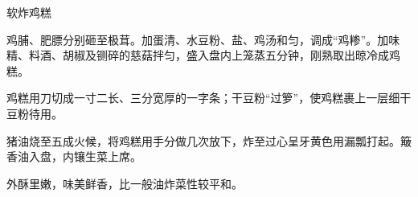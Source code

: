 %
%
%
%
%
%
%
\begin{recipe}{软炸鸡糕}

\ingredients


\preparation

\step 鸡脯、肥膘分别砸至极茸。加蛋清、水豆粉、盐、鸡汤和匀，调成“鸡糁”。加味
精、料酒、胡椒及铡碎的慈菇拌匀，盛入盘内上笼蒸五分钟，刚熟取出晾冷成鸡糕。

\step 鸡糕用刀切成一寸二长、三分宽厚的一字条；干豆粉“过箩”，使鸡糕裹上一层细干
豆粉待用。

\step 猪油烧至五成火候，将鸡糕用手分做几次放下，炸至过心呈牙黄色用漏瓢打起。簸
香油入盘，内镶生菜上席。

\features

外酥里嫩，味美鲜香，比一般油炸菜性较平和。

\end{recipe}

